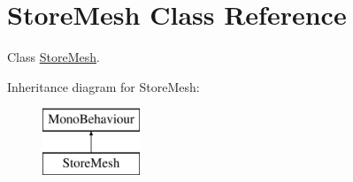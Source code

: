 \hypertarget{class_store_mesh}{}\section{Store\+Mesh Class Reference}
\label{class_store_mesh}


Class \hyperlink{class_store_mesh}{Store\+Mesh}.  


Inheritance diagram for Store\+Mesh\+:\begin{figure}[H]
\begin{center}
\leavevmode
\includegraphics[height=2.000000cm]{class_store_mesh}
\end{center}
\end{figure}
